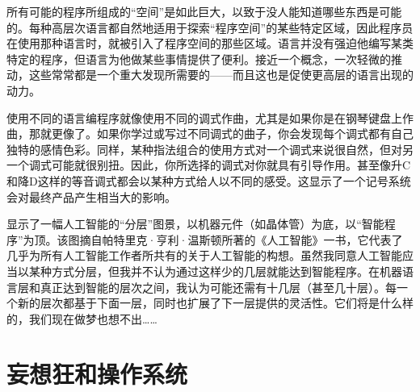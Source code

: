 所有可能的程序所组成的“空间”是如此巨大，以致于没人能知道哪些东西是可能的。每种高层次语言都自然地适用于探索“程序空间”的某些特定区域，因此程序员在使用那种语言时，就被引入了程序空间的那些区域。语言并没有强迫他编写某类特定的程序，但语言为他做某些事情提供了便利。接近一个概念，一次轻微的推动，这些常常都是一个重大发现所需要的——而且这也是促使更高层的语言出现的动力。

使用不同的语言编程序就像使用不同的调式作曲，尤其是如果你是在钢琴键盘上作曲，那就更像了。如果你学过或写过不同调式的曲子，你会发现每个调式都有自己独特的感情色彩。同样，某种指法组合的使用方式对一个调式来说很自然，但对另一个调式可能就很别扭。因此，你所选择的调式对你就具有引导作用。甚至像升C和降D这样的等音调式都会以某种方式给人以不同的感受。这显示了一个记号系统会对最终产品产生相当大的影响。

\begin{figure}
\begin{lrbox}{\TEMPBOX}%
\end{lrbox}
\end{figure}

显示了一幅人工智能的“分层”图景，以机器元件（如晶体管）为底，以“智能程序”为顶。该图摘自帕特里克·亨利·温斯顿所著的《人工智能》一书，它代表了几乎为所有人工智能工作者所共有的关于人工智能的构想。虽然我同意人工智能应当以某种方式分层，但我并不认为通过这样少的几层就能达到智能程序。在机器语言层和真正达到智能的层次之间，我认为可能还需有十几层（甚至几十层）。每一个新的层次都基于下面一层，同时也扩展了下一层提供的灵活性。它们将是什么样的，我们现在做梦也想不出……

\section{妄想狂和操作系统}

